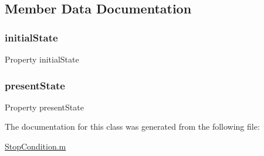\subsection{Member Data Documentation}
\mbox{\label{class_stop_condition_acd9263acfa96c9138afdf497e55acc24}} 
\subsubsection{\texorpdfstring{initial\+State}{initialState}}
{\footnotesize\ttfamily Property initial\+State}

\mbox{\label{class_stop_condition_a9624cc7c421a50fa5086b0ebd0cd5fe3}} 
\subsubsection{\texorpdfstring{present\+State}{presentState}}
{\footnotesize\ttfamily Property present\+State}



The documentation for this class was generated from the following file\+:\begin{DoxyCompactItemize}
\item 
\hyperlink{_stop_condition_8m}{Stop\+Condition.\+m}\end{DoxyCompactItemize}
